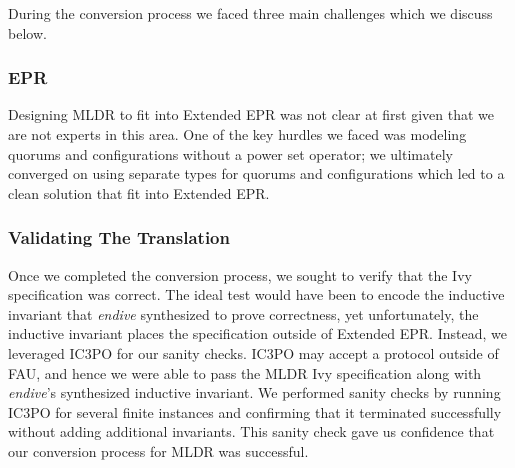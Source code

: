 \documentclass[12pt]{article}
\begin{document}
During the conversion process we faced three main challenges which we discuss below.

\subsubsection{EPR}
\label{sec:mldr-epr}



Designing MLDR to fit into Extended EPR was not clear at first given that we are not experts in this area.  One of the key hurdles we faced was modeling quorums and configurations without a power set operator; we ultimately converged on using separate types for quorums and configurations which led to a clean solution that fit into Extended EPR.

\subsubsection{Validating The Translation}


Once we completed the conversion process, we sought to verify that the Ivy specification was correct.  The ideal test would have been to encode the inductive invariant that \textit{endive} synthesized to prove correctness, yet unfortunately, the inductive invariant places the specification outside of Extended EPR.  Instead, we leveraged IC3PO for our sanity checks.  IC3PO may accept a protocol outside of FAU, and hence we were able to pass the MLDR Ivy specification along with \textit{endive}'s synthesized inductive invariant.  We performed sanity checks by running IC3PO for several finite instances and confirming that it terminated successfully without adding additional invariants.  This sanity check gave us confidence that our conversion process for MLDR was successful.
\end{document}
